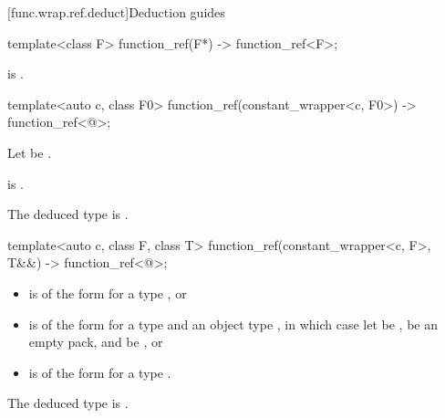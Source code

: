 [func.wrap.ref.deduct]{Deduction guides}

\begin{itemdecl}
template<class F>
  function_ref(F*) -> function_ref<F>;
\end{itemdecl}

\begin{itemdescr}
\pnum
\constraints
{} is .
\end{itemdescr}

\begin{itemdecl}
template<auto c, class F0>
  function_ref(constant_wrapper<c, F0>) -> function_ref<@\seebelow@>;
\end{itemdecl}

\begin{itemdescr}
\pnum
Let  be .

\pnum
\constraints
{} is .

\pnum
\remarks
The deduced type is .
\end{itemdescr}

\begin{itemdecl}
template<auto c, class F, class T>
  function_ref(constant_wrapper<c, F>, T&&) -> function_ref<@\seebelow@>;
\end{itemdecl}

\begin{itemdescr}
\pnum
\constraints
\begin{itemize}
\item {} is of the form  for a type , or
\item {} is of the form  for a type  and an object type , in which case let  be ,  be an empty pack, and  be , or
\item {} is of the form  for a type .
\end{itemize}

\pnum
\remarks
The deduced type is .
\end{itemdescr}
